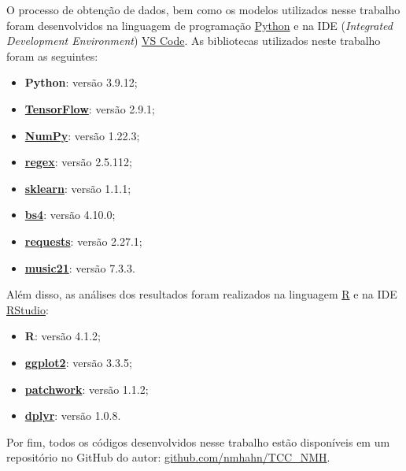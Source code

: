 \documentclass[twoside]{automatextcc}
\begin{document}
O processo de obtenção de dados, bem como os modelos utilizados nesse trabalho foram desenvolvidos na linguagem de programação \href{https://python.org/}{Python} e na IDE (\textit{Integrated Development Environment}) \href{https://code.visualstudio.com}{VS Code}. As bibliotecas utilizados neste trabalho foram as seguintes:
\begin{itemize}
    \item \textbf{Python}: versão 3.9.12;
    \item \href{https://www.tensorflow.org/?hl=pt-br}{\textbf{TensorFlow}}: versão 2.9.1;
    \item \href{https://numpy.org}{\textbf{NumPy}}: versão 1.22.3;
    \item \href{https://pypi.org/project/regex/}{\textbf{regex}}: versão 2.5.112;
    \item \href{https://scikit-learn.org/stable/}{\textbf{sklearn}}: versão 1.1.1;
    \item \href{https://pypi.org/project/beautifulsoup4/}{\textbf{bs4}}: versão 4.10.0;
    \item \href{https://pypi.org/project/requests/}{\textbf{requests}}: versão 2.27.1;
    \item \href{https://web.mit.edu/music21/}{\textbf{music21}}: versão 7.3.3.
\end{itemize}
Além disso, as análises dos resultados foram realizados na linguagem \href{https://cran.r-project.org}{R} e na IDE \href{https://www.rstudio.com}{RStudio}:
\begin{itemize}
    \item \textbf{R}: versão 4.1.2;
    \item \href{https://ggplot2.tidyverse.org}{\textbf{ggplot2}}: versão 3.3.5;
    \item \href{https://patchwork.data-imaginist.com}{\textbf{patchwork}}: versão 1.1.2;
    \item \href{https://dplyr.tidyverse.org}{\textbf{dplyr}}: versão 1.0.8.
\end{itemize}
Por fim, todos os códigos desenvolvidos nesse trabalho estão disponíveis em um repositório no GitHub do autor:  \href{https://github.com/nmhahn/TCC_NMH}{\url{github.com/nmhahn/TCC_NMH}}.



\end{document}
